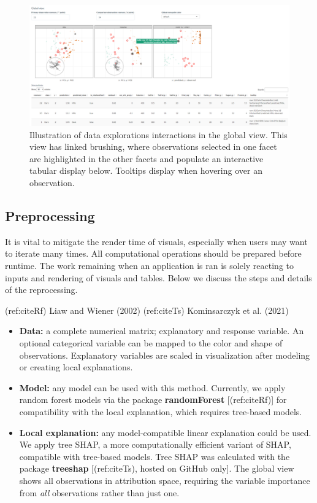 \documentclass[
]{article}
\begin{document}
\begin{figure}

{\centering \includegraphics[width=1\linewidth]{./figures/app_interactions} 

}

\caption{Illustration of data explorations interactions in the global view. This view has linked brushing, where observations selected in one facet are highlighted in the other facets and populate an interactive tabular display below. Tooltips display when hovering over an observation.}\label{fig:interactions}
\end{figure}

\hypertarget{preprocessing}{%
\subsection{Preprocessing}\label{preprocessing}}

It is vital to mitigate the render time of visuals, especially when
users may want to iterate many times. All computational operations
should be prepared before runtime. The work remaining when an
application is ran is solely reacting to inputs and rendering of visuals
and tables. Below we discuss the steps and details of the reprocessing.

(ref:citeRf) Liaw and Wiener (2002) (ref:citeTs) Kominsarczyk et al.
(2021)

\begin{itemize}
    \item \textbf{Data:} a complete numerical matrix; explanatory and response variable. An optional categorical variable can be mapped to the color and shape of observations. Explanatory variables are scaled in visualization after modeling or creating local explanations. 
    \item \textbf{Model:} any model can be used with this method. Currently, we apply random forest models via the package \textbf{randomForest} [(ref:citeRf)] for compatibility with the local explanation, which requires tree-based models.
    \item \textbf{Local explanation:} any model-compatible linear explanation could be used. We apply tree SHAP, a more computationally efficient variant of SHAP, compatible with tree-based models. Tree SHAP was calculated with the package \textbf{treeshap} [(ref:citeTs), hosted on GitHub only]. The global view shows all observations in attribution space, requiring the variable importance from \emph{all} observations rather than just one.
\end{itemize}
\end{document}
